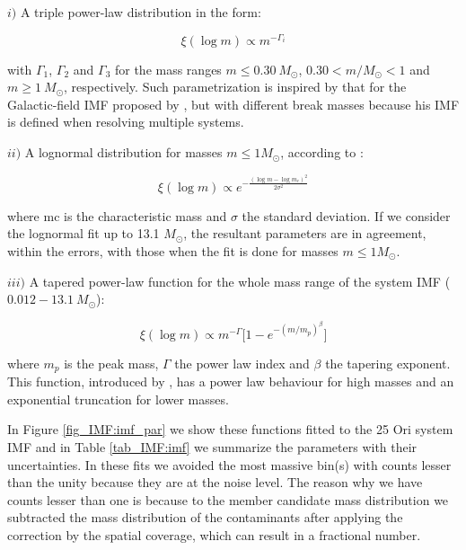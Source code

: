 \documentclass[12pt]{article}
\begin{document}
$i)$ A triple power-law distribution in the form:

\begin{equation}
	\xi(\log m)\propto m^{-\Gamma_i}
\end{equation}

with $\Gamma_1$, $\Gamma_2$ and $\Gamma_3$ for the mass ranges $m\le0.30\ M_\odot$, $0.30<m/M_\odot<1$ and $m\ge1\ M_\odot$, respectively. Such parametrization is inspired by that for the Galactic-field IMF proposed by \citet{Kroupa2001b,Kroupa2002}, but with different break masses because his IMF is defined when resolving multiple systems.

$ii)$ A lognormal distribution for masses $m\le1M_\odot$, according to \citet{Chabrier2003a,Chabrier2003b}:

\begin{equation}
\xi(\log m)\propto e^{-\frac{(\log m-\log m_c)^2}{2\sigma^2}}
\end{equation}

where \ac{mc} is the characteristic mass and $\sigma$ the standard deviation. If we consider the lognormal fit up to 13.1 $M_\odot$, the resultant parameters are in agreement, within the errors, with those when the fit is done for masses $m\le1M_\odot$.

$iii)$ A tapered power-law function for the whole mass range of the system IMF ($0.012-13.1\ M_\odot$):

\begin{equation}
\xi(\log m)\propto m^{-\Gamma} \Big[1-e^{-(m/m_p)^\beta}\Big]
\end{equation}

where $m_p$ is the peak mass, $\Gamma$ the power law index and $\beta$ the tapering exponent. This function, introduced by \citet{DeMarchi2005}, has a power law behaviour for high masses and an exponential truncation for lower masses.

In Figure \ref{fig_IMF:imf_par} we show these functions fitted to the 25 Ori system IMF and in Table \ref{tab_IMF:imf} we summarize the parameters with their uncertainties. In these fits we avoided the most massive bin(s) with counts lesser than the unity because they are at the noise level. The reason why we have counts lesser than one is because to the member candidate mass distribution we subtracted the mass distribution of the contaminants after applying the correction by the spatial coverage, which can result in a fractional number.
\end{document}
